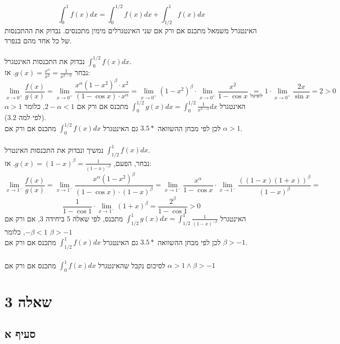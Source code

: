 \documentclass{article}
\newcommand\underrel[2]{\mathrel{\mathop{#2}\limits_{#1}}}
\begin{document}
\[
    \int_0^1 f(x) dx = \int_0^{1/2}f(x)dx + \int_{1/2}^1f(x)dx
\]
האינטגרל משמאל מתכנס אם ורק אם שני האינטגרלים מימין מתכנסים. נבדוק את ההתכנסות של כל אחד מהם בנפרד.
\\\\
נבדוק את התכנסות האינטגרל $\int_0^{1/2}f(x)dx$. \\
נבחר $g(x) = \frac{x^\alpha}{x^2}=\frac{1}{x^{2-\alpha}}$. אז:
\[
    \lim_{x\rightarrow 0^+}\frac{f(x)}{g(x)} =
    \lim_{x\rightarrow 0^+}\frac{x^\alpha(1-x^2)^\beta \cdot x^2}{(1-\cos x)\cdot x^\alpha} =
    \lim_{x\rightarrow 0^+} (1-x^2)^\beta \cdot \lim_{x\rightarrow 0^+} \frac{x^2}{1-\cos x} \underrel{\text{לופיטל}}{=}
    1 \cdot \lim_{x\rightarrow 0^+} \frac{2x}{\sin x} = 2 > 0
\]
האינטגרל $\int_0^{1/2}g(x)dx=\int_0^{1/2}\frac{1}{x^{2-\alpha}}dx$
מתכנס אם ורק אם $2-\alpha < 1$,
כלומר $\alpha > 1$
(לפי למה $3.2$). \\
לכן לפי מבחן ההשוואה $3.5*$
גם האינטגרל $\int_0^{1/2}f(x)dx$
מתכנס אם ורק אם $\alpha > 1$.
\\\\
נמשיך ונבדוק את התכנסות האינטרל $\int_{1/2}^1f(x)dx$. \\
נבחר, הפעם, $g(x)=(1-x)^\beta=\frac{1}{(1-x)^{-\beta}}$. אז:
\[
    \lim_{x\rightarrow 1^-} \frac{f(x)}{g(x)} =
    \lim_{x\rightarrow 1^-} \frac{x^\alpha (1-x^2)^\beta}{(1-\cos x)\cdot (1-x)^\beta} =
    \lim_{x\rightarrow 1^-} \frac{x^\alpha}{1-\cos x} \cdot \lim_{x\rightarrow 1^-} \frac{((1-x)(1+x))^\beta}{(1-x)^\beta} =
\]
\[
    \frac{1}{1-\cos 1} \cdot \lim_{x\rightarrow 1^-} (1+x)^\beta =
    \frac{2^\beta}{1-\cos 1} > 0
\]
האינטגרל $\int_{1/2}^1g(x)dx = \int_{1/2}^1\frac{1}{(1-x)^{-\beta}}$
מתכנס, לפי שאלה 5 ביחידה 3, אם ורק אם $-\beta < 1$, כלומר $\beta > -1$ \\
לכן לפי מבחן ההשוואה $3.5*$
גם האינטגרל $\int_{1/2}^1f(x)dx$
מתכנס אם ורק אם $\beta > -1$.
\\\\
לסיכום נקבל שהאינטגרל $\int_0^1f(x)dx$
מתכנס אם ורק אם $\alpha > 1\wedge \beta > -1$

\section*{שאלה 3}

\subsection*{סעיף א}
\end{document}
